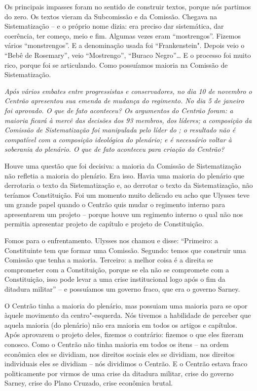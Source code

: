 Os principais impasses foram no sentido de construir
textos, porque nós partimos do zero. Os textos vieram da Subcomissão e
da Comissão. Chegava na Sistematização -- e o próprio nome dizia: era
preciso dar sistemática, dar coerência, ter começo, meio e fim. Algumas
vezes eram ``mostrengos''. Fizemos vários ``monstrengos''. E a
denominação usada foi ``Frankenstein". Depois veio o ``Bebê de
Rosemary'', veio ``Mostrengo'', ``Buraco Negro''\ldots{} E o processo foi
muito rico, porque foi se articulando. Como possuíamos maioria na
Comissão de Sistematização.

\medskip

\noindent\emph{Após vários embates entre progressistas e conservadores, no dia
10 de novembro o Centrão apresentou sua emenda de mudança do regimento.
No dia 5 de janeiro foi aprovado. O que de fato aconteceu? Os argumentos
do Centrão foram: a maioria ficará à mercê das decisões dos 93 membros,
dos líderes; a composição da Comissão de Sistematização foi manipulada
pelo líder do ; o resultado não é compatível com a composição
ideológica do plenário; e é necessário voltar à soberania do plenário. O
que de fato aconteceu para criação do Centrão?}

Houve uma questão que foi decisiva: a maioria da
Comissão de Sistematização não refletia a maioria do plenário. Era isso.
Havia uma maioria do plenário que derrotaria o texto da Sistematização
e, ao derrotar o texto da Sistematização, não teríamos Constituição. Foi
um momento muito delicado eu acho que Ulysses teve um grande papel
quando o Centrão quis mudar o regimento interno para apresentarem um
projeto -- porque houve um regimento interno o qual não nos permitia
apresentar projeto de capítulo e projeto de Constituição.

Fomos para o enfrentamento. Ulysses nos chamou e disse: ``Primeiro: a
Constituinte tem que formar uma Comissão. Segundo: temos que construir
uma Comissão que tenha a maioria. Terceiro: a melhor coisa é a direita
se comprometer com a Constituição, porque se ela não se compromete com a
Constituição, isso pode levar a uma crise institucional logo após o fim
da ditadura militar'' -- e possuíamos um governo fraco, que era o
governo Sarney.

O Centrão tinha a maioria do plenário, mas possuiam uma maioria para se
opor àquele movimento da centro"-esquerda. Nós tivemos a habilidade de
perceber que aquela maioria (do plenário) não era maioria em todos os
artigos e capítulos. Após aprovarem o projeto deles, fizemos o
contrário: fizemos o que eles fizeram conosco. Como o Centrão não tinha
maioria em todos os itens -- na ordem econômica eles se dividiam, nos
direitos sociais eles se dividiam, nos direitos individuais eles se
dividiam -- nós dividimos o Centrão. E o Centrão estava fraco
politicamente por virmos de uma crise da ditadura militar, crise do
governo Sarney, crise do Plano Cruzado, crise econômica brutal.

